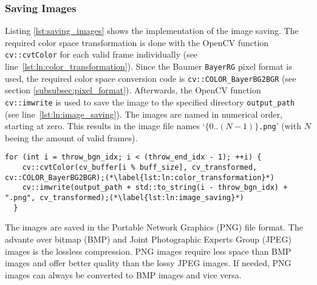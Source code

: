 \subsubsection{Saving Images}
\label{subsubsec:saving_images}

Listing \ref{lst:saving_images} shows the implementation of the image saving.
The required color space transformation is done with the OpenCV function \texttt{cv::cvtColor} for each valid frame individually (see line~\ref{lst:ln:color_transformation}).
Since the Baumer \texttt{BayerRG} pixel format is used, the required color space conversion code is \texttt{cv::COLOR\_BayerBG2BGR} (see section \ref{subsubsec:pixel_format}).
Afterwards, the OpenCV function \texttt{cv::imwrite} is used to save the image to the specified directory \texttt{output\_path} (see line~\ref{lst:ln:image_saving}).
The images are named in numerical order, starting at zero.
This results in the image file names `\texttt{$\{0..(N-1)\}$.png}' (with $N$ beeing the amount of valid frames).

\vspace{5pt}
\begin{lstlisting}[style=C++, caption={Saving the images}, label=lst:saving_images]
  for (int i = throw_bgn_idx; i < (throw_end_idx - 1); ++i) {
    cv::cvtColor(cv_buffer[i % buff_size], cv_transformed, cv::COLOR_BayerBG2BGR);(*\label{lst:ln:color_transformation}*)
    cv::imwrite(output_path + std::to_string(i - throw_bgn_idx) + ".png", cv_transformed);(*\label{lst:ln:image_saving}*)
  }
\end{lstlisting}

The images are saved in the Portable Network Graphics (PNG) file format.
The advante over bitmap (BMP) and Joint Photographic Experts Group (JPEG) images is the lossless compression.
PNG images require less space than BMP images and offer better quality than the lossy JPEG images.
If needed, PNG images can always be converted to BMP images and vice versa.
